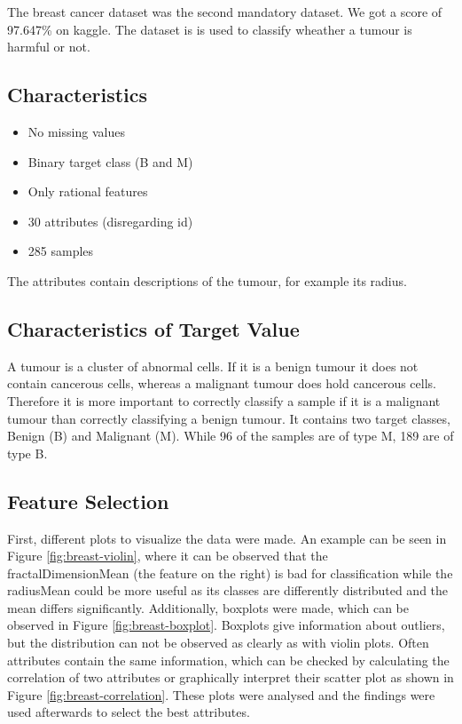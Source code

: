The breast cancer dataset was the second mandatory dataset.
We got a score of 97.647\% on kaggle. 
The dataset is is used to classify wheather a tumour is harmful or not.

\subsection{Characteristics}

\begin{itemize}
\item No missing values
\item Binary target class (B and M)
\item Only rational features
\item 30 attributes (disregarding id)
\item 285 samples
\end{itemize}

The attributes contain descriptions of the tumour, for example its radius.

\subsection{Characteristics of Target Value}

A tumour is a cluster of abnormal cells.
If it is a benign tumour it does not contain cancerous cells, whereas a malignant tumour does hold cancerous cells.
Therefore it is more important to correctly classify a sample if it is a malignant tumour than correctly classifying a benign tumour.
It contains two target classes, Benign (B) and Malignant (M).
While 96 of the samples are of type M, 189 are of type B.



\subsection{Feature Selection}
First, different plots to visualize the data were made.
An example can be seen in Figure \ref{fig:breast-violin}, where it can be observed that the fractalDimensionMean (the feature on the right) is bad for classification while the radiusMean could be more useful as its classes are differently distributed and the mean differs significantly.
Additionally, boxplots were made, which can be observed in Figure \ref{fig:breast-boxplot}.
Boxplots give information about outliers, but the distribution can not be observed as clearly as with violin plots.
Often attributes contain the same information, which can be checked by calculating the correlation of two attributes or graphically interpret their scatter plot as shown in Figure \ref{fig:breast-correlation}.
These plots were analysed and the findings were used afterwards to select the best attributes.


